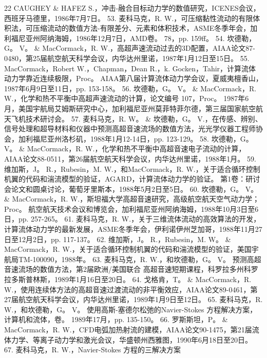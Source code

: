 \documentclass[UTF8,11pt,a4paper,openany,fontset=fandol]{ctexbook}
\begin{document}
22 CAUGHEY \& HAFEZ S.，冲击-融合目标动力学的数值研究，ICENES会议，西班牙马德里，1986年7月7日。 53. 麦科马克，R. W.，可压缩黏性流动的有限体积法，可压缩流动的数值方法-有限差分、元素和体积技术，ASME冬季年会，加利福尼亚州阿纳海姆，1986年12月7日，AMD卷。 78，pp. 159ff。 54. 坎德勒，G。 V。 \& MacCormack，R. W.，高超声速流动过去的3D配置，AIAA论文87-0480，第25届航空航天科学会议，内华达州里诺，1987年1月12日至15日。 55. MacCormack，Robert W.，Chapman，Dean R.，k. Gocken，Tahir，计算流体动力学靠近连续极限，Proc。 AIAA第八届计算流体动力学会议，夏威夷檀香山，1987年6月9日至11日，pp. 153-158。 56. 坎德勒，G。 V。 \& MacCormack，R. W.，化学和热不平衡中高超声速流动的计算，论文编号 107，Proc。 1987年6月，美国宇航局艾姆斯研究中心，加利福尼亚州莫菲特菲尔德，第三届国家航空航天飞机技术研讨会。 57. 麦科马克，R. W。 \& 坎德勒，G。 V.，在传感、辨别、信号处理和超导材料和仪器中预测高超音速流场的数值方法，光光学仪器工程师协会，加利福尼亚州洛杉矶，1988年1月12-14日，pp. 123-129。 58. 坎德勒，G。 V。 \& MacCormack，R. W.，化学和热不平衡中高超音速电子流动的计算，AIAA论文88-0511，第26届航空航天科学会议，内华达州里诺，1988年1月。 59. 维加斯，J。 R.，Rubesin，M. W.，和MacCormack，R. W.，关于适合循环控制机翼的代码和湍流模型的验证，AGARD，计算流体动力学的验证。 第1卷：研讨会论文和圆桌讨论，葡萄牙里斯本，1988年5月2日至5日。 60. 坎德勒，G。 V。 \& MacCormack，R. W.，斯坦福大学高超音速研究，高级航空航天空气动力学；Proc。 航空航天技术会议和博览会，加利福尼亚州阿纳海姆，1988年10月3日至6日，pp. 257-265。 61. 麦科马克，R. W.，关于三维流体流动的高效算法的开发，计算流体动力学的最新发展，ASME冬季年会，伊利诺伊州芝加哥，1988年11月27日至12月2日，pp. 117-137。 62. 维加斯，J。 R.，Rubesin，M. W。 \& MacCormack，R. W.，关于适合循环控制机翼的代码和湍流模型的验证，美国宇航局TM-100090，1988年。 63. 麦科马克，R. W.，和坎德勒，G。 V。 预测高超音速流场的数值方法，第2届欧洲/美国联合 高超音速短期课程，科罗拉多州科罗拉多斯普林斯，1989年1月16日至20日。 64. 戈格肯，T。 \& MacCormack，R. W.，使用连续体方法的高超音速过渡流动的非平衡效应，AIAA论文89-0461，第27届航空航天科学会议，内华达州里诺，1989年1月9日至12日。 65. 麦科马克，R. W.，和坎德勒，G。 V。 使用高斯-塞德尔松弛的Navier-Stokes 方程解决方案，计算机和流体，卷。 1989年17月，pp. 135-150。 66. 罗斯斯坦，P。 \& MacCormack，R. W.，CFD电弧加热射流的建模，AIAA论文90-1475，第21届流体力学、等离子动力学和激光会议，华盛顿州西雅图，1990年6月18日至20日。 67. 麦科马克，R. W.，Navier-Stokes 方程的三解决方案
\end{document}
